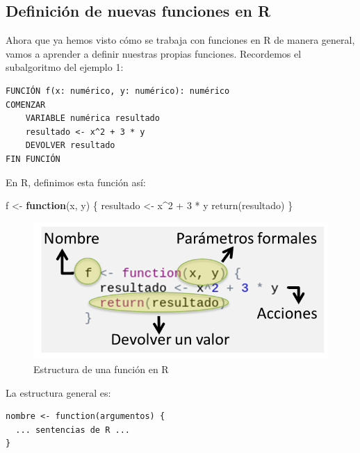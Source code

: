 \documentclass[
]{book}
\newenvironment{Shaded}{\begin{snugshade}}{\end{snugshade}}
\newcommand{\ControlFlowTok}[1]{\textcolor[rgb]{0.13,0.29,0.53}{\textbf{#1}}}
\newcommand{\DecValTok}[1]{\textcolor[rgb]{0.00,0.00,0.81}{#1}}
\newcommand{\FunctionTok}[1]{\textcolor[rgb]{0.00,0.00,0.00}{#1}}
\newcommand{\NormalTok}[1]{#1}
\newcommand{\OtherTok}[1]{\textcolor[rgb]{0.56,0.35,0.01}{#1}}
\newcommand{\SpecialCharTok}[1]{\textcolor[rgb]{0.00,0.00,0.00}{#1}}
\begin{document}
\hypertarget{definiciuxf3n-de-nuevas-funciones-en-r}{%
\subsection{Definición de nuevas funciones en R}\label{definiciuxf3n-de-nuevas-funciones-en-r}}

Ahora que ya hemos visto cómo se trabaja con funciones en R de manera general, vamos a aprender a definir nuestras propias funciones. Recordemos el subalgoritmo del ejemplo 1:

\begin{verbatim}
FUNCIÓN f(x: numérico, y: numérico): numérico
COMENZAR
    VARIABLE numérica resultado
    resultado <- x^2 + 3 * y
    DEVOLVER resultado
FIN FUNCIÓN
\end{verbatim}

En R, definimos esta función así:

\begin{Shaded}
\begin{Highlighting}[]
\NormalTok{f }\OtherTok{\textless{}{-}} \ControlFlowTok{function}\NormalTok{(x, y) \{}
\NormalTok{    resultado }\OtherTok{\textless{}{-}}\NormalTok{ x}\SpecialCharTok{\^{}}\DecValTok{2} \SpecialCharTok{+} \DecValTok{3} \SpecialCharTok{*}\NormalTok{ y}
    \FunctionTok{return}\NormalTok{(resultado)}
\NormalTok{\}}
\end{Highlighting}
\end{Shaded}

\begin{figure}

{\centering \includegraphics[width=0.8\linewidth]{images/03_funciones/31} 

}

\caption{Estructura de una función en R}\label{fig:unnamed-chunk-70}
\end{figure}

La estructura general es:

\begin{verbatim}
nombre <- function(argumentos) {
  ... sentencias de R ...
}
\end{verbatim}
\end{document}
